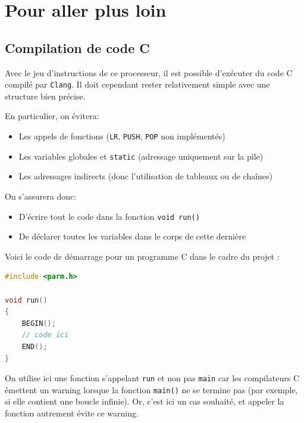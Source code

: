 \documentclass{article}
\begin{document}
    \section{Pour aller plus loin}

    \subsection{Compilation de code C}
    Avec le jeu d'instructions de ce processeur, il est possible d'exécuter du code C compilé par \texttt{Clang}.
    Il doit cependant rester relativement simple avec une structure bien précise.

    En particulier, on évitera:
    \begin{itemize}
        \item Les appels de fonctions (\texttt{LR}, \texttt{PUSH}, \texttt{POP} non implémentés)
        \item Les variables globales et \texttt{static} (adressage uniquement sur la pile)
        \item Les adressages indirects (donc l'utilisation de tableaux ou de chaînes)
    \end{itemize}

    On s'assurera donc:
    \begin{itemize}
        \item D'écrire tout le code dans la fonction \texttt{void run()}
        \item De déclarer toutes les variables dans le corps de cette dernière
    \end{itemize}
    
    Voici le code de démarrage pour un programme C dans le cadre du projet :
     \begin{lstlisting}[language=C]
#include <parm.h>

void run()
{
	BEGIN();
	// code ici	
	END();
}
    \end{lstlisting}
    
    On utilise ici une fonction s'appelant \texttt{run} et non pas \texttt{main} car les compilateurs C émettent un warning lorsque la fonction \texttt{main()} ne se termine pas (par exemple, si elle contient une boucle infinie). Or, c'est ici un cas souhaité, et appeler la fonction autrement évite ce warning.
    
\end{document}

